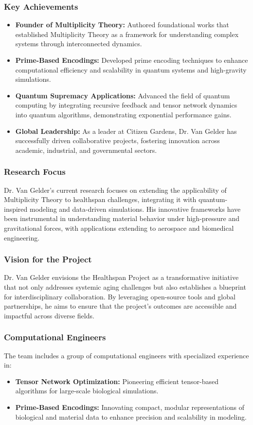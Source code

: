 \documentclass{article}
\theoremstyle{plain}
\begin{document}
\subsubsection*{Key Achievements}
\begin{itemize}
    \item \textbf{Founder of Multiplicity Theory:} Authored foundational works that established Multiplicity Theory as a framework for understanding complex systems through interconnected dynamics.
    \item \textbf{Prime-Based Encodings:} Developed prime encoding techniques to enhance computational efficiency and scalability in quantum systems and high-gravity simulations.
    \item \textbf{Quantum Supremacy Applications:} Advanced the field of quantum computing by integrating recursive feedback and tensor network dynamics into quantum algorithms, demonstrating exponential performance gains.
    \item \textbf{Global Leadership:} As a leader at Citizen Gardens, Dr. Van Gelder has successfully driven collaborative projects, fostering innovation across academic, industrial, and governmental sectors.
\end{itemize}

\subsubsection*{Research Focus}
Dr. Van Gelder’s current research focuses on extending the applicability of Multiplicity Theory to healthspan challenges, integrating it with quantum-inspired modeling and data-driven simulations. His innovative frameworks have been instrumental in understanding material behavior under high-pressure and gravitational forces, with applications extending to aerospace and biomedical engineering.

\subsubsection*{Vision for the Project}
Dr. Van Gelder envisions the Healthspan Project as a transformative initiative that not only addresses systemic aging challenges but also establishes a blueprint for interdisciplinary collaboration. By leveraging open-source tools and global partnerships, he aims to ensure that the project's outcomes are accessible and impactful across diverse fields.


\subsubsection*{Computational Engineers}
The team includes a group of computational engineers with specialized experience in:
\begin{itemize}
    \item \textbf{Tensor Network Optimization:} Pioneering efficient tensor-based algorithms for large-scale biological simulations.
    \item \textbf{Prime-Based Encodings:} Innovating compact, modular representations of biological and material data to enhance precision and scalability in modeling.
\end{itemize}
\end{document}
